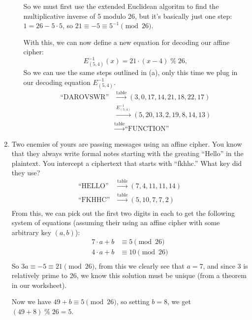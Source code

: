 \documentclass[11pt]{article}
\newcommand{\mmod}{\;\%\;}
\begin{document}
\begin{enumerate}
\begin{enumerate}
          So we must first use the extended Euclidean algoritm to find the multiplicative inverse of 5 modulo 26, but it's basically just one step: \(1 = 26 - 5 \cdot 5\), so \(21 \equiv -5 \equiv 5^{-1} \pmod{26}\).

          With this, we can now define a new equation for decoding our affine cipher:
          \[E^{-1}_{(5,4)}(x) = 21 \cdot (x - 4) \mmod{26},\]
          So we can use the same steps outlined in (a), only this time we plug in our decoding equation \(E^{-1}_{(5,4)}\).
          \begin{align*}
            \text{``DAROVSWR''} &\xrightarrow{\text{table}} (3,0,17,14,21,18,22,17) \\
                                &\xrightarrow{E^{-1}_{(5,4)}} (5,20,13,2,19,8,14,13) \\
                                  &\xrightarrow{\text{table}} \text{``FUNCTION''}
          \end{align*}
      \end{enumerate}
      \newpage

    \item Two enemies of yours are passing messages using an affine cipher.  You know that they always write formal notes starting with the greating ``Hello'' in the plaintext.  You intercept a ciphertext that starts with ``fkhhc.'' What key did they use?
      \begin{align*}
        \text{``HELLO''} &\xrightarrow{\text{table}} (7,4,11,11,14) \\
        \text{``FKHHC''} &\xrightarrow{\text{table}} (5,10,7,7,2) \\
      \end{align*}
      From this, we can pick out the first two digits in each to get the following system of equations (assuming their using an affine cipher with some arbitrary key \((a,b)\)):
      \begin{align*}
        7 \cdot a + b &\equiv 5 \pmod{26} \\
        4 \cdot a + b &\equiv 10 \pmod{26} \\
      \end{align*}
      So \(3a \equiv -5 \equiv 21 \pmod{26}\), from this we clearly see that \(a=7\), and since 3 is relatively prime to 26, we know this solution must be unique (from a theorem in our worksheet).

      Now we have \(49 + b \equiv 5 \pmod{26}\), so setting \(b=8\), we get \((49 + 8 ) \mmod 26 = 5\).  


\end{enumerate}
\end{document}
